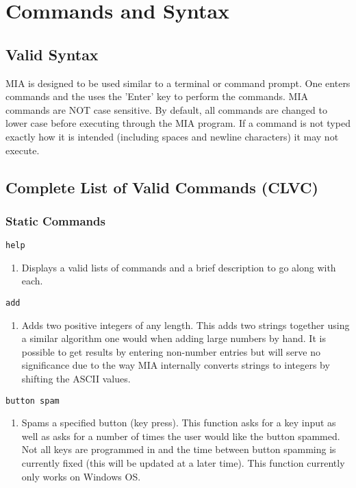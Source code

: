 \chapter{Commands and Syntax}
\pagestyle{fancy}

\section{Valid Syntax}
MIA is designed to be used similar to a terminal or command prompt. One enters commands and the uses the 'Enter' key to perform the commands. MIA commands are NOT case sensitive. By default, all commands are changed to lower case before executing through the MIA program. If a command is not typed exactly how it is intended (including spaces and newline characters) it may not execute.


\section{Complete List of Valid Commands (CLVC)} \label{CLVC}

\subsection{Static Commands}

\begin{lstlisting}
help
\end{lstlisting}
\begin{enumerate}
	\item[] Displays a valid lists of commands and a brief description to go along with each.
\end{enumerate}

\begin{lstlisting} 
add   
\end{lstlisting}
\begin{enumerate}
	\item[] Adds two positive integers of any length. This adds two strings together using a similar algorithm one would when adding large numbers by hand. It is possible to get results by entering non-number entries but will serve no significance due to the way MIA internally converts strings to integers by shifting the ASCII values.
\end{enumerate}

\begin{lstlisting} 
button spam
\end{lstlisting}
\begin{enumerate}
	\item[] Spams a specified button (key press). This function asks for a key input as well as asks for a number of times the user would like the button spammed. Not all keys are programmed in and the time between button spamming is currently fixed (this will be updated at a later time). This function currently only works on Windows OS.
\end{enumerate}

